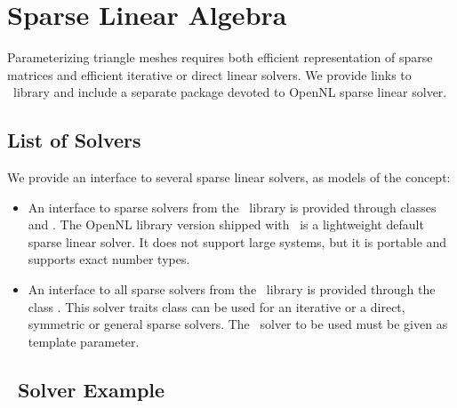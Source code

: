 \section{Sparse Linear Algebra \label{sec:Sparse-Linear-Algebra}}

Parameterizing triangle meshes requires both efficient representation
of sparse matrices and efficient iterative or direct linear
solvers. We provide links to \eigen\ library
and include a separate package devoted to OpenNL sparse linear solver.

\subsection{List of Solvers}

We provide an interface to several sparse linear solvers, as models
of the  concept:

\begin{itemize}
\item
    An interface to sparse solvers from the \opennl\ library \cite{cgal:l-nmdgp-05} is provided through classes
     and 
    . The OpenNL library version shipped with \cgal\
    is a lightweight default sparse linear solver. It does not support large systems, but it is portable and
    supports exact number types.

\item
    An interface to all sparse solvers from the \ccThirdPartyEigen\ library is provided through the class
    \ccc{CGAL::Eigen_solver_traits<T>}. This solver traits class can be used for an iterative or a direct,
    symmetric or general sparse solvers. The \eigen\ solver to be used must be given as template parameter.

\end{itemize}


\subsection{\eigen\ Solver Example}

